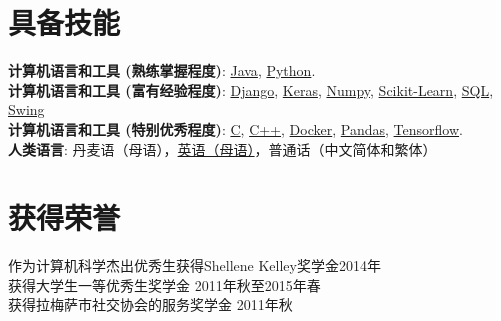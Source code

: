 \documentclass[margin]{res}
\begin{document}
\begin{resume}


\section{具备技能}

\textbf{计算机语言和工具 (熟练掌握程度)}: \href{http://www.lucaskjaero.com/projects/tech/java/}{Java}, \href{http://www.lucaskjaero.com/projects/tech/python/}{Python}.
\\
\textbf{计算机语言和工具 (富有经验程度)}: \href{http://www.lucaskjaero.com/projects/tech/django/}{Django}, \href{http://www.lucaskjaero.com/projects/tech/keras/}{Keras}, \href{http://www.lucaskjaero.com/projects/tech/numpy/}{Numpy}, \href{http://www.lucaskjaero.com/projects/tech/sklearn/}{Scikit-Learn}, \href{http://www.lucaskjaero.com/projects/tech/postgresql/}{SQL}, \href{http://www.lucaskjaero.com/projects/tech/swing/}{Swing}
\\
\textbf{计算机语言和工具 (特别优秀程度)}: \href{http://www.lucaskjaero.com/projects/tech/c/}{C}, \href{http://www.lucaskjaero.com/projects/tech/cplusplus/}{C++}, \href{http://www.lucaskjaero.com/projects/tech/docker/}{Docker}, \href{http://www.lucaskjaero.com/projects/tech/pandas/}{Pandas}, \href{http://www.lucaskjaero.com/projects/tech/tensorflow/}{Tensorflow}.
\\
\textbf{人类语言}: 丹麦语（母语），\href{https://www.lucaskjaerozhang.com/lucas-kjaero-zhang-resume.pdf}{英语（母语）}，普通话（中文简体和繁体）


\section{获得荣誉}
作为计算机科学杰出优秀生获得Shellene Kelley奖学金\hfill 2014年\\
获得大学生一等优秀生奖学金 \hfill 2011年秋至2015年春\\
获得拉梅萨市社交协会的服务奖学金 \hfill 2011年秋


\end{resume}
\end{document}
